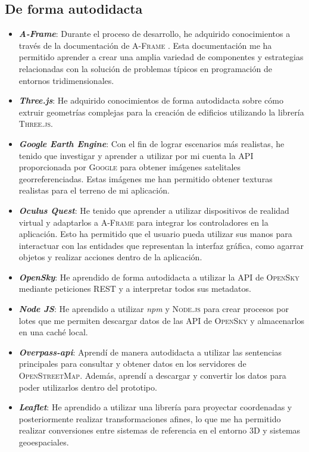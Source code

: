 \documentclass[a4paper, 11pt]{book}
\begin{document}
\subsection{De forma autodidacta}
\begin{itemize}
	\item \textbf{\emph{A-Frame}}: Durante el proceso de desarrollo, he adquirido conocimientos a través de la documentación de \textsc{A-Frame} \cite{aframedocs}. Esta documentación me ha permitido aprender a crear una amplia variedad de componentes y estrategias relacionadas con la solución de problemas típicos en programación de entornos tridimensionales.
	\item \textbf{\emph{Three.js}}: He adquirido conocimientos de forma autodidacta sobre cómo extruir geometrías complejas para la creación de edificios utilizando la librería \textsc{Three.js}.
	\item \textbf{\emph{Google Earth Engine}}: Con el fin de lograr escenarios más realistas, he tenido que investigar y aprender a utilizar por mi cuenta la \textsc{API} proporcionada por \textsc{Google} para obtener imágenes satelitales georreferenciadas. Estas imágenes me han permitido obtener texturas realistas para el terreno de mi aplicación.
	\item \textbf{\emph{Oculus Quest}}: He tenido que aprender a utilizar dispositivos de realidad virtual y adaptarlos a \textsc{A-Frame} para integrar los controladores en la aplicación. Esto ha permitido que el usuario pueda utilizar sus manos para interactuar con las entidades que representan la interfaz gráfica, como agarrar objetos y realizar acciones dentro de la aplicación.
	\item \textbf{\emph{OpenSky}}: He aprendido de forma autodidacta a utilizar la \textsc{API} de \textsc{OpenSky} mediante peticiones \textsc{REST} y a interpretar todos sus metadatos.
	\item \textbf{\emph{Node JS}}: He aprendido a utilizar \emph{npm} y \textsc{Node.js} para crear procesos por lotes que me permiten descargar datos de las \textsc{API} de \textsc{OpenSky} y almacenarlos en una caché local.
	\item \textbf{\emph{Overpass-api}}: Aprendí de manera autodidacta a utilizar las sentencias principales para consultar y obtener datos en los servidores de \textsc{OpenStreetMap}. Además, aprendí a descargar y convertir los datos para poder utilizarlos dentro del prototipo.
	\item \textbf{\emph{Leaflet}}: He aprendido a utilizar una librería para proyectar coordenadas y posteriormente realizar transformaciones afines, lo que me ha permitido realizar conversiones entre sistemas de referencia en el entorno 3D y sistemas geoespaciales.

\end{itemize}
\end{document}
